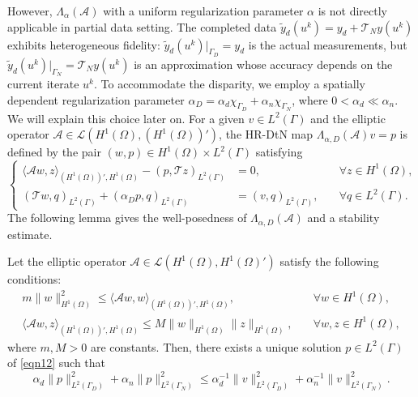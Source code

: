 \documentclass[onefignum,onetabnum]{siamart190516}
\numberwithin{equation}{section}
\begin{document}
However, $\Lambda_{\alpha}(\mathcal{A})$ with a uniform regularization parameter $\alpha$ is not directly applicable in partial data setting.
The completed data $\tilde{y}_{d}(u^{k}) = y_{d} + \mathcal{T}_{N}y(u^{k})$ exhibits heterogeneous fidelity: $\tilde{y}_{d}(u^{k})|_{\Gamma_{D}} = y_d$ is the actual measurements, but $\tilde{y}_{d}(u^{k})|_{\Gamma_{N}} = \mathcal{T}_{N}y(u^{k})$ is an approximation whose accuracy depends on the current iterate $u^{k}$.
To accommodate the disparity, we employ a spatially dependent regularization parameter $\alpha_D = \alpha_{d}\chi_{\Gamma_{D}}+\alpha_{n}\chi_{\Gamma_{N}}$, where $0 < \alpha_{d} \ll \alpha_{n}$.
{We will explain this choice later on.}
For a given $v \in L^2(\Gamma)$ and the elliptic operator $\mathcal{A} \in \mathcal{L}(H^1(\Omega), (H^1(\Omega))')$, the HR-DtN map $\Lambda_{\alpha,D}(\mathcal{A})v = p$ is defined by the pair $(w, p) \in H^1(\Omega) \times L^2(\Gamma)$ satisfying
\begin{equation}\label{eqn12}
\left\{
\begin{aligned}
\langle \mathcal{A}w, z \rangle_{(H^1(\Omega))', H^1(\Omega)} - (p, \mathcal{T}z)_{L^2(\Gamma)} &= 0, \quad &\forall z \in H^1(\Omega), \\
(\mathcal{T}w, q)_{L^2(\Gamma)} + (\alpha_D p, q)_{L^2(\Gamma)} &= (v, q)_{L^2(\Gamma)}, \quad &\forall q \in L^2(\Gamma).
\end{aligned}
\right.
\end{equation}
The following lemma gives the well-posedness of $\Lambda_{\alpha,D}(\mathcal{A})$ and a  stability estimate.

\begin{lemma}\label{lemma1}
Let the elliptic operator $\mathcal{A} \in \mathcal{L}(H^{1}(\Omega), H^{1}(\Omega)')$ satisfy the following conditions:
\begin{equation*}
\begin{aligned}
m \|w\|_{H^{1}(\Omega)}^{2} \leq \langle \mathcal{A}w, w \rangle_{(H^{1}(\Omega))', H^{1}(\Omega)},&\quad\forall w\in H^{1}(\Omega), \\
\langle \mathcal{A}w, z \rangle_{(H^{1}(\Omega))', H^{1}(\Omega)} \leq M \|w\|_{H^{1}(\Omega)} \|z\|_{H^{1}(\Omega)},&\quad\forall w,z\in H^{1}(\Omega),
\end{aligned}
\end{equation*}
where $m, M > 0$ are constants.
Then, there exists a unique solution $p \in L^{2}(\Gamma)$ of \eqref{eqn12} such that
\begin{equation*}
\alpha_{d} \|p\|_{L^{2}(\Gamma_{D})}^{2} + \alpha_{n} \|p\|_{L^{2}(\Gamma_{N})}^{2} \leq \alpha_{d}^{-1}\|v\|_{L^{2}(\Gamma_{D})}^{2} + \alpha_{n}^{-1} \|v\|_{L^{2}(\Gamma_{N})}^{2}.
\end{equation*}
\end{lemma}
\end{document}
